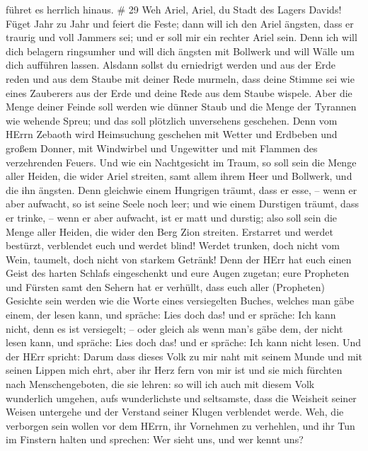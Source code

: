 führet es herrlich hinaus. \# 29  Weh Ariel, Ariel, du Stadt
des Lagers Davids! Füget Jahr zu Jahr und feiert die Feste; 
dann will ich den Ariel ängsten, dass er traurig und voll Jammers sei;
und er soll mir ein rechter Ariel sein.  Denn ich will dich
belagern ringsumher und will dich ängsten mit Bollwerk und will Wälle um
dich aufführen lassen.  Alsdann sollst du erniedrigt werden
und aus der Erde reden und aus dem Staube mit deiner Rede murmeln, dass
deine Stimme sei wie eines Zauberers aus der Erde und deine Rede aus dem
Staube wispele.  Aber die Menge deiner Feinde soll werden
wie dünner Staub und die Menge der Tyrannen wie wehende Spreu; und das
soll plötzlich unversehens geschehen.  Denn vom HErrn
Zebaoth wird Heimsuchung geschehen mit Wetter und Erdbeben und großem
Donner, mit Windwirbel und Ungewitter und mit Flammen des verzehrenden
Feuers.  Und wie ein Nachtgesicht im Traum, so soll sein die
Menge aller Heiden, die wider Ariel streiten, samt allem ihrem Heer und
Bollwerk, und die ihn ängsten.  Denn gleichwie einem
Hungrigen träumt, dass er esse, -- wenn er aber aufwacht, so ist seine
Seele noch leer; und wie einem Durstigen träumt, dass er trinke, -- wenn
er aber aufwacht, ist er matt und durstig; also soll sein die Menge
aller Heiden, die wider den Berg Zion streiten.  Erstarret
und werdet bestürzt, verblendet euch und werdet blind! Werdet trunken,
doch nicht vom Wein, taumelt, doch nicht von starkem Getränk!
 Denn der HErr hat euch einen Geist des harten Schlafs
eingeschenkt und eure Augen zugetan; eure Propheten und Fürsten samt den
Sehern hat er verhüllt,  dass euch aller (Propheten)
Gesichte sein werden wie die Worte eines versiegelten Buches, welches
man gäbe einem, der lesen kann, und spräche: Lies doch das! und er
spräche: Ich kann nicht, denn es ist versiegelt; --  oder
gleich als wenn man's gäbe dem, der nicht lesen kann, und spräche: Lies
doch das! und er spräche: Ich kann nicht lesen.  Und der
HErr spricht: Darum dass dieses Volk zu mir naht mit seinem Munde und
mit seinen Lippen mich ehrt, aber ihr Herz fern von mir ist und sie mich
fürchten nach Menschengeboten, die sie lehren:  so will ich
auch mit diesem Volk wunderlich umgehen, aufs wunderlichste und
seltsamste, dass die Weisheit seiner Weisen untergehe und der Verstand
seiner Klugen verblendet werde.  Weh, die verborgen sein
wollen vor dem HErrn, ihr Vornehmen zu verhehlen, und ihr Tun im
Finstern halten und sprechen: Wer sieht uns, und wer kennt uns?
